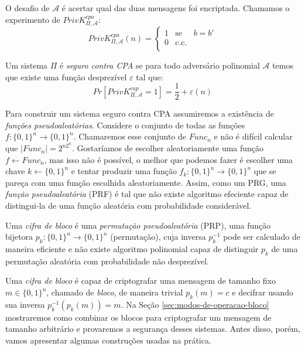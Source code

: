 O desafio de $\mathcal{A}$ é acertar qual das duas mensagens foi encriptada.
Chamamos o experimento de $PrivK^{cpa}_{\Pi, \mathcal{A}}$:
\begin{displaymath}
  PrivK^{cpa}_{\Pi, \mathcal{A}}(n) = \left\{
    \begin{array}{lcl}
      1 & \textrm{se} & b = b'\\
      0 & \textrm{c.c.} &\\
    \end{array}
    \right.
\end{displaymath}

Um sistema $\Pi$ é {\em seguro contra CPA} se para todo adversário polinomial $\mathcal{A}$ temos que existe uma função desprezível $\varepsilon$ tal que:
\begin{displaymath}
  Pr[PrivK^{cap}_{\Pi, \mathcal{A}} = 1] = \frac{1}{2} + \varepsilon(n)
\end{displaymath}

Para construir um sistema seguro contra CPA assumiremos a existência de {\em funções pseudoaleatórias}.
Considere o conjunto de todas as funções $f: \{0,1\}^n \to \{0,1\}^n$.
Chamaremos esse conjunto de $Func_n$ e não é difícil calcular que $|Func_n| = 2^{n2^n}$.
Gostaríamos de escolher aleatoriamente uma função $f \leftarrow Func_n$, mas isso não é possível, o melhor que podemos fazer é escolher uma chave $k \leftarrow \{0,1\}^n$ e tentar produzir uma função $f_k: \{0,1\}^n \to \{0,1\}^n$ que se pareça com uma função escolhida aleatoriamente.
Assim, como um PRG, uma {\em função pseudoaleatória} (PRF) é tal que não existe algoritmo efeciente capaz de distingui-la de uma função aleatória com probabilidade considerável.

Uma {\em cifra de bloco} é uma {\em permutação pseudoaleatória} (PRP), uma função bijetora $p_k: \{0,1\}^n \to \{0,1\}^n$ (permutação), cuja inversa $p_k^{-1}$ pode ser calculado de maneira eficiente e não existe algoritmo polinomial capaz de distinguir $p_k$ de uma permutação aleatória com probabilidade não desprezível.

Uma {\em cifra de bloco} é capaz de criptografar uma mensagem de tamanho fixo $m \in \{0,1\}^n$, chamado de {\em bloco}, de maneira trivial $p_k(m) = c$ e decifrar usando sua inversa $p_k^{-1}(p_k(m)) = m$.
Na Seção \ref{sec:modos-de-operacao-bloco} mostraremos como combinar os blocos para criptografar um mensagem de tamanho arbitrário e provaremos a segurança desses sistemas.
Antes disso, porém, vamos apresentar algumas construções usadas na prática.

